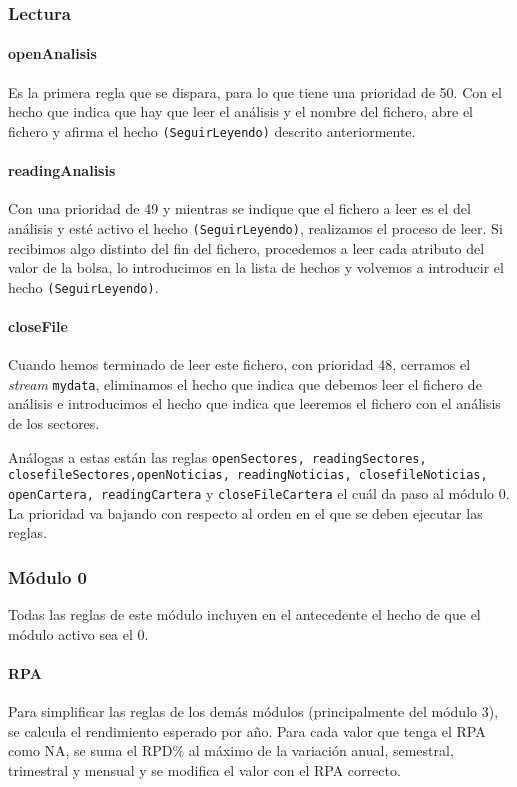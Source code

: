 \documentclass[11pt,leqno]{article}
\theoremstyle{definition_wo_parentheses}
\theoremstyle{plain}
\theoremstyle{remark}
\begin{document}
\subsubsection{Lectura}

\paragraph{openAnalisis} Es la primera regla que se dispara, para lo que tiene una prioridad de 50. Con el hecho que indica que hay que leer el análisis y el nombre del fichero, abre el fichero y afirma el hecho \texttt{(SeguirLeyendo)} descrito anteriormente.

\paragraph{readingAnalisis} Con una prioridad de 49 y mientras se indique que el fichero a leer es el del análisis y esté activo el hecho \texttt{(SeguirLeyendo)}, realizamos el proceso de leer. Si recibimos algo distinto del fin del fichero, procedemos a leer cada atributo del valor de la bolsa, lo introducimos en la lista de hechos y volvemos a introducir el hecho \texttt{(SeguirLeyendo)}. 

\paragraph{closeFile} Cuando hemos terminado de leer este fichero, con prioridad 48, cerramos el \textit{stream} \texttt{mydata}, eliminamos el hecho que indica que debemos leer el fichero de análisis e introducimos el hecho que indica que leeremos el fichero con el análisis de los sectores. 

Análogas a estas están las reglas \texttt{openSectores, readingSectores, closefileSectores,openNoticias, readingNoticias, closefileNoticias, openCartera, readingCartera} y  \texttt{closeFileCartera} el cuál da paso al módulo 0. La prioridad va bajando con respecto al orden en el que se deben ejecutar las reglas. 

\subsubsection{Módulo 0}

Todas las reglas de este módulo incluyen en el antecedente el hecho de que el módulo activo sea el 0.

\paragraph{RPA} Para simplificar las reglas de los demás módulos (principalmente del módulo 3), se calcula el rendimiento esperado por año. Para cada valor que tenga el RPA como NA, se suma el RPD$\%$ al máximo de la variación anual, semestral, trimestral y mensual y se modifica el valor con el RPA correcto.
\end{document}
